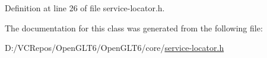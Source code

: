 Definition at line 26 of file service-\/locator.\+h.



The documentation for this class was generated from the following file\+:\begin{DoxyCompactItemize}
\item 
D\+:/\+V\+C\+Repos/\+Open\+G\+L\+T6/\+Open\+G\+L\+T6/core/\mbox{\hyperlink{service-locator_8h}{service-\/locator.\+h}}\end{DoxyCompactItemize}

